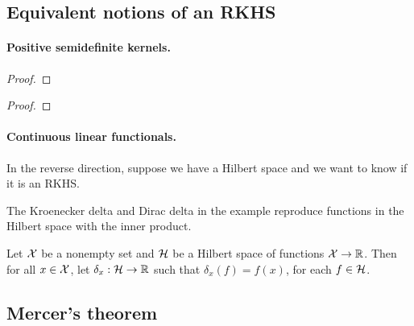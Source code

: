 \subsection{Equivalent notions of an RKHS}
\label{sub:rkhs-equivalence}


\paragraph{Positive semidefinite kernels.}

\begin{theorem}
    \label{thm:moore-aronszajn}
    \cite{aronszajn1950theory}
    
\end{theorem}
\begin{proof}
    
\end{proof}

\begin{theorem}
    \label{thm:rk-uniqueness}
    \cite{aronszajn1950theory}
    
\end{theorem}
\begin{proof}
    
\end{proof}

\paragraph{Continuous linear functionals.}

In the reverse direction, suppose we have a Hilbert space and we want to know if it is an RKHS.

\begin{example}
    \label{eg:r4-rkhs}
    
\end{example}

The Kroenecker delta and Dirac delta in the example reproduce functions in the Hilbert space with the inner product.

\begin{definition}
    Let \(\mathcal{X}\) be a nonempty set and \(\mathcal{H}\) be a Hilbert space of functions \(\mathcal{X} \to \mathbb{R}\).
    Then for all \(x \in \mathcal{X}\), let \(\delta_x : \mathcal{H} \to \mathbb{R}\) such that \(\delta_x(f) = f(x)\), for each \(f \in \mathcal{H}\).
\end{definition}

\subsection{Mercer's theorem}
\label{sub:mercers-theorem}



